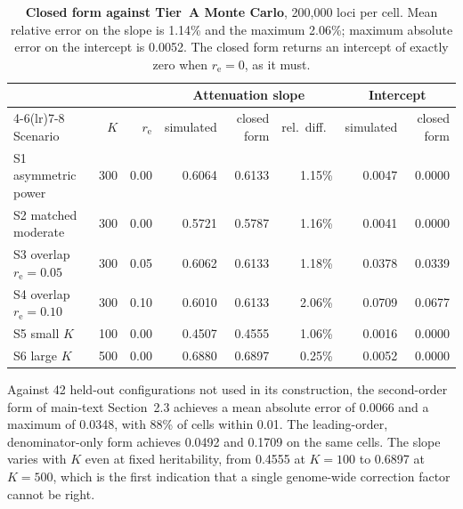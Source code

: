 \documentclass[11pt,a4paper]{article}
\newcommand{\re}{r_{\mathrm{e}}}
\begin{document}
\vspace{1em}

\begin{table}[htbp]
\centering
\caption{\textbf{Closed form against Tier~A Monte Carlo}, 200,000 loci per cell. Mean
relative error on the slope is 1.14\% and the maximum 2.06\%; maximum absolute error on
the intercept is 0.0052. The closed form returns an intercept of exactly zero when
$\re = 0$, as it must.}
\label{tab:S2}
\small
\begin{tabular}{@{}lrrrrrrr@{}}
\toprule
& & & \multicolumn{3}{c}{Attenuation slope} & \multicolumn{2}{c}{Intercept} \\
\cmidrule(lr){4-6}\cmidrule(lr){7-8}
Scenario & $K$ & $\re$ & simulated & closed form & rel.\ diff.\ & simulated & closed form \\
\midrule
S1 asymmetric power & 300 & 0.00 & 0.6064 & 0.6133 & 1.15\% & 0.0047 & 0.0000 \\
S2 matched moderate & 300 & 0.00 & 0.5721 & 0.5787 & 1.16\% & 0.0041 & 0.0000 \\
S3 overlap $\re=0.05$ & 300 & 0.05 & 0.6062 & 0.6133 & 1.18\% & 0.0378 & 0.0339 \\
S4 overlap $\re=0.10$ & 300 & 0.10 & 0.6010 & 0.6133 & 2.06\% & 0.0709 & 0.0677 \\
S5 small $K$ & 100 & 0.00 & 0.4507 & 0.4555 & 1.06\% & 0.0016 & 0.0000 \\
S6 large $K$ & 500 & 0.00 & 0.6880 & 0.6897 & 0.25\% & 0.0052 & 0.0000 \\
\bottomrule
\end{tabular}
\end{table}

\noindent Against 42 held-out configurations not used in its construction, the
second-order form of main-text Section~2.3 achieves a mean absolute error of 0.0066 and a
maximum of 0.0348, with 88\% of cells within 0.01. The leading-order, denominator-only form
achieves 0.0492 and 0.1709 on the same cells. The slope varies with $K$ even at fixed
heritability, from 0.4555 at $K=100$ to 0.6897 at $K=500$, which is the first indication
that a single genome-wide correction factor cannot be right.

\vspace{1em}
\end{document}
